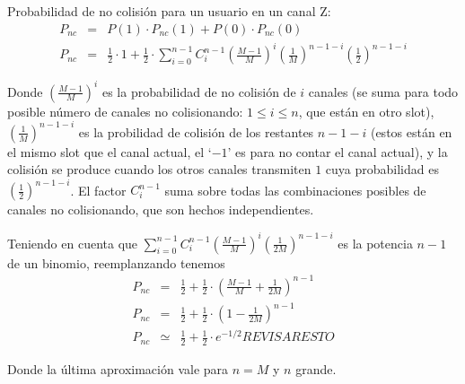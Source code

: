 \noindent Probabilidad de no colisión para un usuario en un canal Z:
\begin{eqnarray}
P_{nc} & = & P(1) \cdot P_{nc}(1) + P(0) \cdot P_{nc}(0) \\
P_{nc} & = & \frac{1}{2} \cdot 1 +  \frac{1}{2} \cdot \sum_{i=0}^{n-1} 
C^{n-1}_{i} \left(\frac{M-1}{M}\right)^i  \left(\frac{1}{M}\right)^{n-1-i}  \left(\frac{1}{2}\right)^{n-1-i} 
\end{eqnarray}

\noindent Donde $\left(\frac{M-1}{M}\right)^i$ es la probabilidad de no colisión de $i$ canales (se suma para todo posible número de canales no
colisionando: $1\leq i\leq n$, que están en otro slot), $
\left(\frac{1}{M}\right)^{n-1-i}$ es la probilidad de colisión de los restantes
$n-1-i$ (estos están en el mismo slot que el canal actual, el `$-1$' es para no
contar el canal actual), y la colisión se produce cuando los otros canales
transmiten $1$ cuya probabilidad es $\left(\frac{1}{2}\right)^{n-1-i}$. El
factor $C^{n-1}_{i}$ suma sobre todas las combinaciones posibles de canales no
colisionando, que son hechos independientes.

\noindent Teniendo en cuenta que $ \sum_{i=0}^{n-1}
C^{n-1}_{i} \left(\frac{M-1}{M}\right)^i  \left(\frac{1}{2M}\right)^{n-1-i}$ es la potencia $n-1$ de un binomio, reemplanzando tenemos
\begin{eqnarray}
P_{nc} & = & \frac{1}{2} +  \frac{1}{2} \cdot \left(\frac{M-1}{M} + \frac{1}{2M} \right)^{n-1} \\
P_{nc} & = & \frac{1}{2} +  \frac{1}{2} \cdot \left(1- \frac{1}{2M} \right)^{n-1} \\
P_{nc} & \simeq & \frac{1}{2} +  \frac{1}{2} \cdot e^{-1/2} REVISAR ESTO
\end{eqnarray}

\noindent Donde la última aproximación vale para $n=M$ y $n$ grande.

\iffalse

\vspace{5mm}


